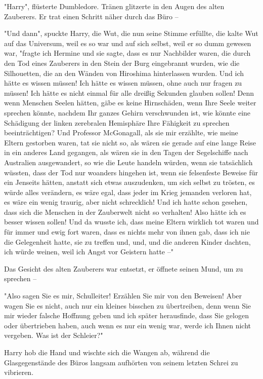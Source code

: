 {"Harry", flüsterte Dumbledore. Tränen glitzerte in den Augen des alten Zauberers. Er trat einen Schritt näher durch das Büro --

"Und dann", spuckte Harry, die Wut, die nun seine Stimme erfüllte, die kalte Wut auf das Universum, weil es so war und auf sich selbst, weil er so dumm gewesen war, "fragte ich Hermine und sie sagte, dass es nur Nachbilder waren, die durch den Tod eines Zauberers in den Stein der Burg eingebrannt wurden, wie die Silhouetten, die an den Wänden von Hiroshima hinterlassen wurden. Und ich hätte es wissen müssen! Ich hätte es wissen müssen, ohne auch nur fragen zu müssen! Ich hätte es nicht einmal für alle dreißig Sekunden glauben sollen! Denn wenn Menschen Seelen hätten, gäbe es keine Hirnschäden, wenn Ihre Seele weiter sprechen könnte, nachdem Ihr ganzes Gehirn verschwunden ist, wie könnte eine Schädigung der linken zerebralen Hemisphäre Ihre Fähigkeit zu sprechen beeinträchtigen? Und Professor McGonagall, als sie mir erzählte, wie meine Eltern gestorben waren, tat sie nicht so, als wären sie gerade auf eine lange Reise in ein anderes Land gegangen, als wären sie in den Tagen der Segelschiffe nach Australien ausgewandert, so wie die Leute handeln würden, wenn sie tatsächlich wüssten, dass der Tod nur woanders hingehen ist, wenn sie felsenfeste Beweise für ein Jenseits hätten, anstatt sich etwas auszudenken, um sich selbst zu trösten, es würde alles verändern, es wäre egal, dass jeder im Krieg jemanden verloren hat, es wäre ein wenig traurig, aber nicht schrecklich! Und ich hatte schon gesehen, dass sich die Menschen in der Zauberwelt nicht so verhalten! Also hätte ich es besser wissen sollen! Und da wusste ich, dass meine Eltern wirklich tot waren und für immer und ewig fort waren, dass es nichts mehr von ihnen gab, dass ich nie die Gelegenheit hatte, sie zu treffen und, und, und die anderen Kinder dachten, ich würde weinen, weil ich Angst vor Geistern hatte --"

Das Gesicht des alten Zauberers war entsetzt, er öffnete seinen Mund, um zu sprechen --

"Also sagen Sie es mir, Schulleiter! Erzählen Sie mir von den Beweisen! Aber wagen Sie es nicht, auch nur ein kleines bisschen zu übertreiben, denn wenn Sie mir wieder falsche Hoffnung geben und ich später herausfinde, dass Sie gelogen oder übertrieben haben, auch wenn es nur ein wenig war, werde ich Ihnen nicht vergeben. Was ist der Schleier?"

Harry hob die Hand und wischte sich die Wangen ab, während die Glasgegenstände des Büros langsam aufhörten von seinem letzten Schrei zu vibrieren.

}
